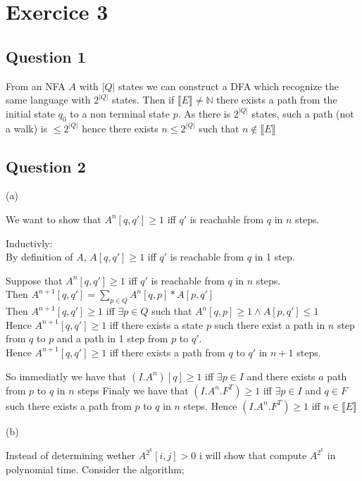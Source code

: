 \section{Exercice 3}
\subsection{Question 1}
From an NFA $A$ with $|Q|$ states we can construct a DFA which recognize the same language with $2^{|Q|}$ states. Then if $\llbracket E \rrbracket \neq \mathbb{N}$ there exists a path from the initial state $q_0$ to a non terminal state $p$.
As there is $2^{|Q|}$ states, such a path (not a walk) is $\le 2^{|Q|}$ hence there exists $n \le 2^{|Q|}$ such that $n \notin \llbracket E \rrbracket$

\subsection{Question 2}

(a)

We want to show that $A^n[q,q'] \ge 1$ iff $q'$ is reachable from $q$ in $n$ steps.

Inductivly:
\\By definition of $A$, $A[q,q'] \ge 1$ iff $q'$ is reachable from $q$ in 1 step.

Suppose that $A^n[q,q'] \ge 1$ iff $q'$ is reachable from $q$ in $n$ steps.
\\Then $A^{n+1}[q,q'] = \sum_{p\in Q} A^{n}[q,p] * A[p,q']$
\\Then $A^{n+1}[q,q'] \ge 1$ iff $\exists p \in Q$ such that $A^{n}[q,p] \ge 1 \land A[p,q'] \le 1 $
\\Hence $A^{n+1}[q,q'] \ge 1$ iff there exists a state $p$ such there exist a path in $n$ step from $q$ to $p$ and a path in 1 step from $p$ to $q'$.
\\Hence $A^{n+1}[q,q'] \ge 1$ iff  there exists a path from $q$ to $q'$ in $n+1$ steps.

So immediatly we have that $(I.A^n)[q] \ge 1$ iff $\exists p\in I$ and there exists $a$ path from $p$ to $q$ in $n$ steps
Finaly we have that $(I.A^n.F^T) \ge 1$ iff $\exists p \in I$ and $q \in F$ such there exists a path from $p$ to $q$ in $n$ steps.
Hence $(I.A^n.F^T) \ge 1$ iff $n \in \llbracket E \rrbracket$   

(b)


Instead of determining wether $A^{2^k}[i,j] > 0$ i will show that compute $A^{2^k}$ in polynomial time.
Consider the algorithm;

